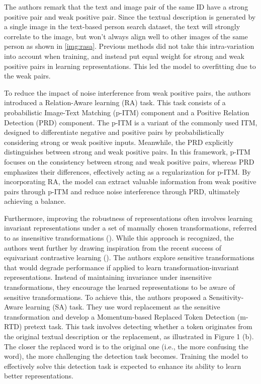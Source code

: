 The authors remark that the text and image pair of the same ID have a strong positive pair and weak positive pair. Since the textual description is generated by a single image in the text-based person search dataset, the text will strongly correlate to the image, but won't always align well to other images of the same person as shown in \ref{img:rasa}. Previous methods did not take this intra-variation into account when training, and instead put equal weight for strong and weak positive pairs in learning representations. This led the model to overfitting due to the weak pairs.

To reduce the impact of noise interference from weak positive pairs, the authors introduced a Relation-Aware learning (RA) task. This task consists of a probabilistic Image-Text Matching (p-ITM) component and a Positive Relation Detection (PRD) component. The p-ITM is a variant of the commonly used ITM, designed to differentiate negative and positive pairs by probabilistically considering strong or weak positive inputs. Meanwhile, the PRD explicitly distinguishes between strong and weak positive pairs. In this framework, p-ITM focuses on the consistency between strong and weak positive pairs, whereas PRD emphasizes their differences, effectively acting as a regularization for p-ITM. By incorporating RA, the model can extract valuable information from weak positive pairs through p-ITM and reduce noise interference through PRD, ultimately achieving a balance.

Furthermore, improving the robustness of representations often involves learning invariant representations under a set of manually chosen transformations, referred to as insensitive transformations (\cite{caron2021unsupervisedlearningvisualfeatures}). While this approach is recognized, the authors went further by drawing inspiration from the recent success of equivariant contrastive learning (\cite{dangovski2022equivariantcontrastivelearning}). The authors explore sensitive transformations that would degrade performance if applied to learn transformation-invariant representations. Instead of maintaining invariance under insensitive transformations, they encourage the learned representations to be aware of sensitive transformations. 
To achieve this, the authors proposed a Sensitivity-Aware learning (SA) task. They use word replacement as the sensitive transformation and develop a Momentum-based Replaced Token Detection (m-RTD) pretext task. This task involves detecting whether a token originates from the original textual description or the replacement, as illustrated in Figure 1 (b). The closer the replaced word is to the original one (i.e., the more confusing the word), the more challenging the detection task becomes. Training the model to effectively solve this detection task is expected to enhance its ability to learn better representations.

